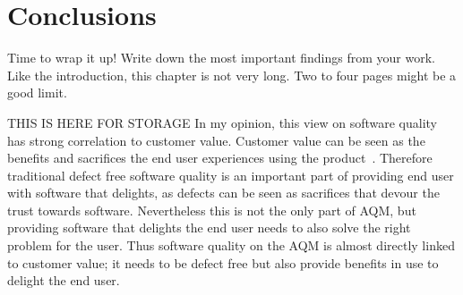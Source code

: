 \chapter{Conclusions}
\label{chapter:conclusions}

Time to wrap it up! 
Write down the most important findings from your work. 
Like the introduction, this chapter is not very long.
Two to four pages might be a good limit. 


THIS IS HERE FOR STORAGE
In my opinion, this view on software quality has strong correlation to customer value. Customer value can be seen as
    the benefits and sacrifices the end user experiences using the product~\cite{woodruff1997customer}. Therefore traditional
    defect free software quality is an important part of providing end user with software that delights, as defects
    can be seen as sacrifices that devour the trust towards software. Nevertheless this is not the only part of AQM,
    but providing software that delights the end user needs to also solve the right problem for the user.
    Thus software quality on the AQM is almost directly linked to customer value; it needs to be defect free but also
    provide benefits in use to delight the end user.